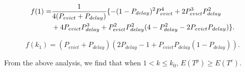 \begin{enumerate}
  \begin{equation}
  \label{equ:f1}
  \begin{split}
    \scriptsize
    f(1) =& \frac{1}{4(P_{evict}+P_{delay})}\{-(1-P_{delay})^{2}P_{evict}^{4} + 2P_{evict}^{3}P_{delay}^{2}\\ & + 4P_{evict}P_{delay}^{3} + P_{evict}^{2}P_{delay}^{2}(4-P_{delay}^{2} - 2P_{evict}P_{delay})\}.
  \end{split}\end{equation}


  \begin{equation}
  \label{equ:fk1}
    f(k_{1}) = (P_{evict}+P_{delay})(2P_{delay}- 1 + P_{evict}P_{delay}(1 - P_{delay})).
  \end{equation}




\end{enumerate}
From the above analysis, we find that when $1< k \leq k_{0}$, $E(T^{p}) \geq E(T^{c})$.

